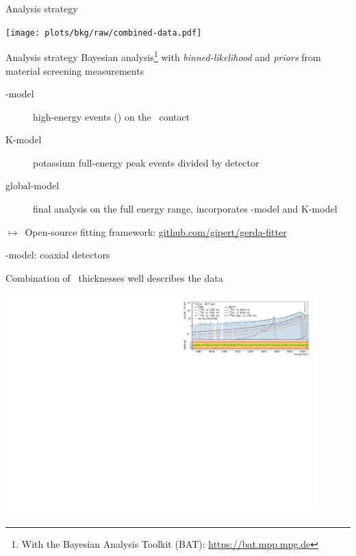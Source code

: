 \documentclass[10pt,aspectratio=169]{beamer}
\newcommand{\github}[1]{\href{https://github.com/#1}{github.com/#1}}
\newcommand{\arrow}{$\longmapsto$}
\begin{document}
\begin{frame}{Analysis strategy}
  \begin{center}
    \texttt{[image: plots/bkg/raw/combined-data.pdf]}
  \end{center}
\end{frame}
\begin{frame}{Analysis strategy}
  \alert{Bayesian} analysis\footnote{With the Bayesian Analysis Toolkit (BAT):
  \url{https://bat.mpp.mpg.de}} with \emph{binned-likelihood} and \emph{priors}
  from material screening measurements
  \begin{description}
    \item[\a-model] \alert{high-energy events} (\a) on the \pplus\ contact
    \item[K-model] \alert{potassium full-energy peak} events divided by
      detector
    \item[global-model] final analysis on the \alert{full energy range},
      incorporates \a-model and K-model
  \end{description}

  \arrow\ Open-source fitting framework: \github{gipert/gerda-fitter}
\end{frame}
\begin{frame}{\a-model: coaxial detectors}
  \begin{simpleblock}
    \centering
    Combination of \pplus\ thicknesses well describes the data
  \end{simpleblock}
  \begin{center}
    \includegraphics[width=0.9\textwidth]{plots/bkg/raw/ph2/results/amodel/amodel-enrCoax.pdf}
  \end{center}
\end{frame}
\end{document}
